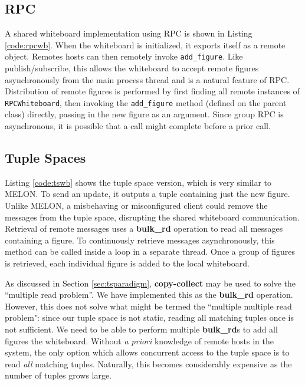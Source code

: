 \subsection{RPC}

A shared whiteboard implementation using RPC is shown in Listing \ref{code:rpcwb}. When the whiteboard is initialized, it exports itself as a remote object. Remotes hosts can then remotely invoke \texttt{add\_figure}. Like publish/subscribe, this allows the whiteboard to accept remote figures asynchronously from the main process thread and is a natural feature of RPC. Distribution of remote figures is performed by first finding all remote instances of \texttt{RPCWhiteboard}, then invoking the \texttt{add\_figure} method (defined on the parent class) directly, passing in the new figure as an argument. Since group RPC is asynchronous, it is possible that a call might complete before a prior call.

\subsection{Tuple Spaces}

Listing \ref{code:tswb} shows the tuple space version, which is very similar to MELON. To send an update, it outputs a tuple containing just the new figure. Unlike MELON, a misbehaving or misconfigured client could remove the messages from the tuple space, disrupting the shared whiteboard communication. Retrieval of remote messages uses a \textbf{bulk\_rd} operation to read all messages containing a figure. To continuously retrieve messages asynchronously, this method can be called inside a loop in a separate thread. Once a group of figures is retrieved, each individual figure is added to the local whiteboard. 

As discussed in Section \ref{sec:tsparadigm}, \textbf{copy-collect} may be used to solve the ``multiple read problem''. We have implemented this as the \textbf{bulk\_rd} operation. However, this does not solve what might be termed the ``multiple multiple read problem": since our tuple space is not static, reading all matching tuples once is not sufficient. We need to be able to perform multiple \textbf{bulk\_rd}s to add all figures the whiteboard. Without \textit{a priori} knowledge of remote hosts in the system, the only option which allows concurrent access to the tuple space is to read \textit{all} matching tuples. Naturally, this becomes considerably expensive as the number of tuples grows large.

